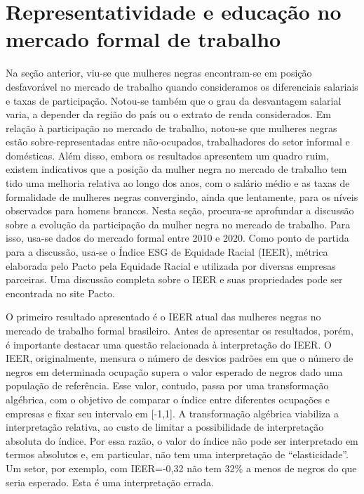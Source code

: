 \documentclass[12pt]{article}
\begin{document}
\section{Representatividade e educação no mercado formal de trabalho} \label{rais_representatividade}

\par Na seção anterior, viu-se que mulheres negras encontram-se em posição desfavorável no mercado de trabalho quando consideramos os diferenciais salariais e taxas de participação. Notou-se também que o grau da desvantagem salarial varia, a depender da região do país ou o extrato de renda considerados. Em relação à participação no mercado de trabalho, notou-se que mulheres negras estão sobre-representadas entre não-ocupados, trabalhadores do setor informal e domésticas.
Além disso, embora os resultados apresentem um quadro ruim, existem indicativos que a posição da mulher negra no mercado de trabalho tem tido uma melhoria relativa ao longo dos anos, com o salário médio e as taxas de formalidade de mulheres negras convergindo, ainda que lentamente, para os níveis observados para homens brancos. Nesta seção, procura-se aprofundar a discussão sobre a evolução da participação da mulher negra no mercado de trabalho. Para isso, usa-se dados do mercado formal entre 2010 e 2020. Como ponto de partida para a discussão, usa-se o Índice ESG de Equidade Racial (IEER), métrica elaborada pelo Pacto pela Equidade Racial e utilizada por diversas empresas parceiras. Uma discussão completa sobre o IEER e suas propriedades pode ser encontrada no site Pacto. 

\par O primeiro resultado apresentado é o IEER atual das mulheres negras no mercado de trabalho formal brasileiro. Antes de apresentar os resultados, porém, é importante destacar uma questão relacionada à interpretação do IEER. O IEER, originalmente, mensura o número de desvios padrões em que o número de negros em determinada ocupação supera o valor esperado de negros dado uma população de referência. Esse valor, contudo, passa por uma transformação algébrica, com o objetivo de comparar o índice entre diferentes ocupações e empresas e fixar seu intervalo em [-1,1]. A transformação algébrica viabiliza a interpretação relativa, ao custo de limitar a possibilidade de interpretação absoluta do índice. Por essa razão, o valor do índice não pode ser interpretado em termos absolutos e, em particular, não tem uma interpretação de \enquote{elasticidade}. Um setor, por exemplo, com IEER=-0,32 não tem 32\% a menos de negros do que seria esperado. Esta é uma interpretação errada.
\end{document}
